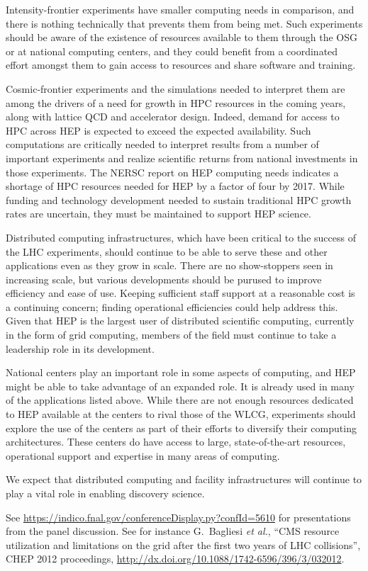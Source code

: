 Intensity-frontier experiments have smaller computing needs in comparison, and there is nothing technically that prevents them from being met.  Such experiments should be aware of the existence of resources available to them through the OSG or at national computing centers, and they could benefit from a coordinated effort amongst them to gain access to resources and share software and training.

Cosmic-frontier experiments and the simulations needed to interpret them are among the drivers of a need for growth in HPC resources in the coming years, along with lattice QCD and accelerator design.  Indeed, demand for access to HPC across HEP is expected to exceed the expected availability.  
Such computations are critically needed to interpret results from a number of important experiments and realize scientific returns from national investments in those experiments.  The NERSC report on HEP computing needs indicates a shortage of HPC resources needed for HEP by a factor of four by 2017.  While funding and technology development needed to sustain traditional HPC growth rates are uncertain, they must be maintained to support HEP science.

Distributed computing infrastructures, which have been critical to the success of the LHC experiments, should continue to be able to serve these and other applications even as they grow in scale.  There are no show-stoppers seen in increasing scale, but various developments should be purused to improve efficiency and ease of use.  Keeping sufficient staff support at a reasonable cost is a continuing concern; finding operational efficiencies could help address this.  Given that HEP is the largest user of distributed scientific computing, currently in the form of grid computing, members of the field must continue to take a leadership role in its development.

National centers play an important role in some aspects of computing, and HEP might be able to take advantage of an expanded role.  It is already used in many of the applications listed above.  While there are not enough resources dedicated to HEP available at the centers to rival those of the WLCG, experiments should explore the use of the centers as part of their efforts to diversify their computing architectures.  These centers do have access to large, state-of-the-art resources, operational support and expertise in many areas of computing.

We expect that distributed computing and facility infrastructures will continue to play a vital role in enabling discovery science.


\begin{thebibliography}{99}
 See \url{https://indico.fnal.gov/conferenceDisplay.py?confId=5610} for presentations from the panel discussion.
 See for instance G.~Bagliesi {\it et al.}, ``CMS resource utilization and limitations on the grid after the first two years of LHC collisions'', CHEP 2012 proceedings, \url{http://dx.doi.org/10.1088/1742-6596/396/3/032012}.
\end{thebibliography}


